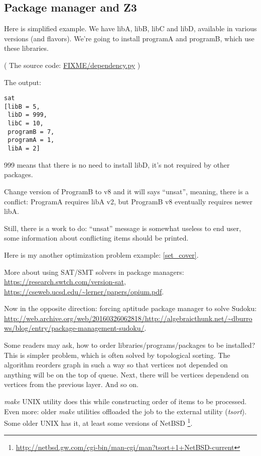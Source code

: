 \subsection{Package manager and Z3}

Here is simplified example.
We have libA, libB, libC and libD, available in various versions (and flavors).
We're going to install programA and programB, which use these libraries.



( The source code: \url{FIXME/dependency.py} )

The output:

\begin{lstlisting}
sat
[libB = 5,
 libD = 999,
 libC = 10,
 programB = 7,
 programA = 1,
 libA = 2]
\end{lstlisting}

999 means that there is no need to install libD, it's not required by other packages.

Change version of ProgramB to v8 and it will says ``unsat'', meaning, there is a conflict:
ProgramA requires libA v2, but ProgramB v8 eventually requires newer libA.

Still, there is a work to do: ``unsat'' message is somewhat useless to end user,
some information about conflicting items should be printed.

Here is my another optimization problem example: \ref{set_cover}.

More about using SAT/SMT solvers in package managers: \url{https://research.swtch.com/version-sat},
\url{https://cseweb.ucsd.edu/~lerner/papers/opium.pdf}.

Now in the opposite direction: forcing aptitude package manager to solve Sudoku: \\
\url{http://web.archive.org/web/20160326062818/http://algebraicthunk.net/~dburrows/blog/entry/package-management-sudoku/}.

Some readers may ask, how to order libraries/programs/packages to be installed?
This is simpler problem, which is often solved by topological sorting.
The algorithm reorders graph in such a way so that vertices not depended on anything will be on the top of queue.
Next, there will be vertices dependend on vertices from the previous layer.
And so on.

\textit{make} UNIX utility does this while constructing order of items to be processed.
Even more: older \textit{make} utilities offloaded the job to the external utility (\textit{tsort}).
Some older UNIX has it, at least some versions of NetBSD
\footnote{\url{http://netbsd.gw.com/cgi-bin/man-cgi/man?tsort+1+NetBSD-current}}.

